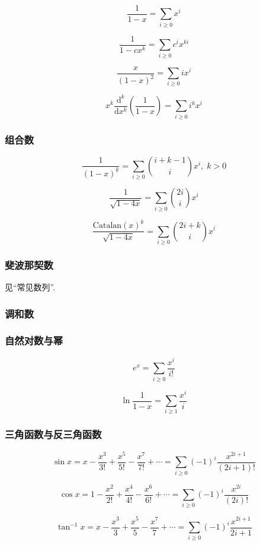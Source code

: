$$\frac 1 {1 - x} = \sum_{i \ge 0} x ^ i$$

$$\frac 1 {1 - c x ^ k} = \sum_{i \ge 0} c ^ i x ^ {k i}$$

$$\frac x {(1 - x) ^ 2} = \sum_{i \ge 0} i x ^ i$$

$$x ^ k \frac {\mathrm{d} ^ k} {\mathrm{d} x ^ k} \left( \frac 1 {1 - x} \right) = \sum_{i \ge 0} i ^ k x ^ i$$

\subsubsection{组合数}

$$\frac 1 {(1 - x) ^ k} = \sum_{i \ge 0} {i + k - 1 \choose i} x ^ i, \; k > 0$$

$$\frac 1 {\sqrt {1 - 4x}} = \sum_{i \ge 0} {2i \choose i} x ^ i$$

$$\frac {\mathrm{Catalan}(x) ^ k} {\sqrt {1 - 4x}} = \sum_{i \ge 0} {2i + k \choose i} x ^ i$$

\subsubsection{斐波那契数}

见``常见数列''.

\subsubsection{调和数}

\subsubsection{自然对数与幂}

$$e ^ x = \sum_{i \ge 0} \frac {x ^ i} {i!}$$

$$\ln \frac 1 {1 - x} = \sum_{i \ge 1} \frac {x ^ i} i$$

\subsubsection{三角函数与反三角函数}

$$\sin x = x - \frac {x ^ 3} {3!} + \frac {x ^ 5} {5!} - \frac {x ^ 7} {7!} + \cdots = \sum_{i \ge 0} (-1) ^ i \frac {x ^ {2 i + 1}} {(2 i + 1)!}$$

$$\cos x = 1 - \frac {x ^ 2} {2!} + \frac {x ^ 4} {4!} - \frac {x ^ 6} {6!} + \cdots = \sum_{i \ge 0} (-1) ^ i \frac {x ^ {2 i}} {(2 i)!}$$

$$\tan ^ {-1} x = x - \frac {x ^ 3} 3 + \frac {x ^ 5} 5 - \frac {x ^ 7} 7 + \cdots = \sum_{i \ge 0} (-1) ^ i \frac {x ^ {2 i + 1}} {2 i + 1}$$
